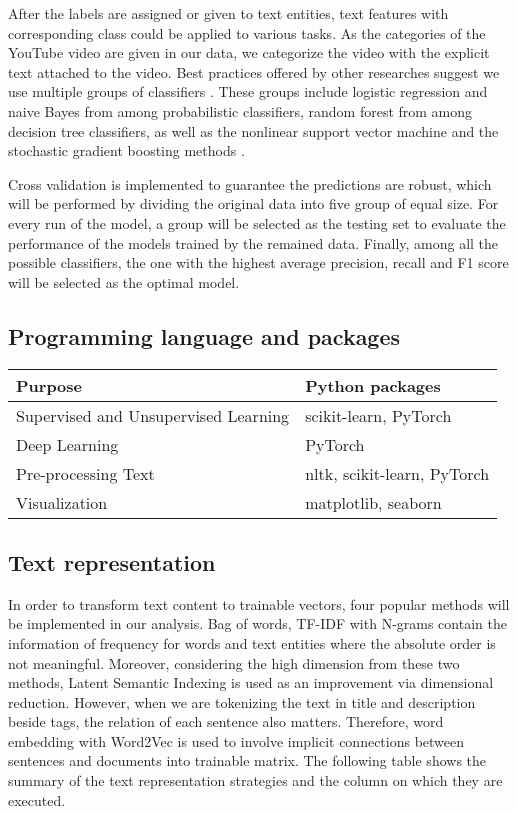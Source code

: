 \documentclass[letterpaper, 12pt]{article}
\begin{document}
After the labels are assigned or given to text entities, text features with corresponding class could be applied to various tasks. As the categories of the YouTube video are given in our data, we categorize the video with the explicit text attached to the video. Best practices offered by other researches suggest we use multiple groups of classifiers \cite{dumais-etal-1998-inductive} \cite{sebastiani-2002-ml}. These groups include logistic regression and naive Bayes from among probabilistic classifiers, random forest from among decision tree classifiers, as well as the nonlinear support vector machine and the stochastic gradient boosting methods \cite{friedman-2002-stochastic}.

Cross validation is implemented to guarantee the predictions are robust, which will be performed by dividing the original data into five group of equal size. For every run of the model, a group will be selected as the testing set to evaluate the performance of the models trained by the remained data. Finally, among all the possible classifiers, the one with the highest average precision, recall and F1 score will be selected as the optimal model.

\subsection{Programming language and packages}

\begin{table}[H]
  \centering
  \begin{tabular}{ll}
    \toprule
    Purpose & Python packages \\
    \midrule
    Supervised and Unsupervised Learning & scikit-learn, PyTorch  \\
    Deep Learning & PyTorch \\ 
    Pre-processing Text & nltk, scikit-learn, PyTorch \\ 
    Visualization &  matplotlib, seaborn \\ 
    \bottomrule
  \end{tabular}
\end{table}

\subsection{Text representation}

In order to transform text content to trainable vectors, four popular methods will be implemented in our analysis. Bag of words, TF-IDF with N-grams contain the information of frequency for words and text entities where the absolute order is not meaningful. Moreover, considering the high dimension from these two methods, Latent Semantic Indexing is used as an improvement via dimensional reduction. However, when we are tokenizing the text in title and description beside tags, the relation of each sentence also matters. Therefore, word embedding with Word2Vec is used to involve implicit connections between sentences and documents into trainable matrix. The following table shows the summary of the text representation strategies and the column on which they are executed.
\end{document}
